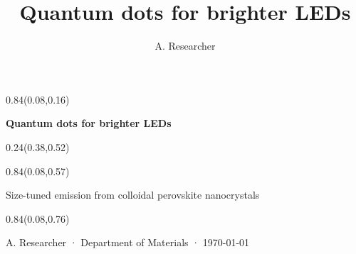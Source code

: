\documentclass[aspectratio=169]{beamer}
\title{Quantum dots for brighter LEDs}
\author{A. Researcher}
\begin{document}
\begin{frame}[t]

\begin{textblock}{0.84}(0.08,0.16)
{\centering\fontsize{32}{38}\selectfont \textcolor[HTML]{1A1A1A}{\textbf{Quantum dots for brighter LEDs}}\par}
\end{textblock}

\begin{textblock}{0.24}(0.38,0.52)
\end{textblock}

\begin{textblock}{0.84}(0.08,0.57)
{\centering\fontsize{17}{20}\selectfont \textcolor[HTML]{555555}{Size-tuned emission from colloidal perovskite nanocrystals}\par}
\end{textblock}

\begin{textblock}{0.84}(0.08,0.76)
{\centering\fontsize{13}{16}\selectfont \textcolor[HTML]{555555}{A. Researcher  ·  Department of Materials  ·  \today}\par}
\end{textblock}
\end{frame}
\end{document}
